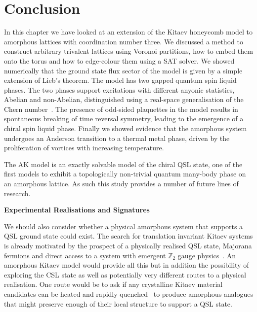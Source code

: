 \hypertarget{sec:AMK-Conclusion}{%
\section{Conclusion}\label{sec:AMK-Conclusion}}

In this chapter we have looked at an extension of the Kitaev honeycomb model to amorphous lattices with coordination number three. We discussed a method to construct arbitrary trivalent lattices using Voronoi partitions, how to embed them onto the torus and how to edge-colour them using a SAT solver. We showed numerically that the ground state flux sector of the model is given by a simple extension of Lieb's theorem. The model has two gapped quantum spin liquid phases. The two phases support excitations with different anyonic statistics, Abelian and non-Abelian, distinguished using a real-space generalisation of the Chern number~\autocite{peru_preprint}. The presence of odd-sided plaquettes in the model results in spontaneous breaking of time reversal symmetry, leading to the emergence of a chiral spin liquid phase. Finally we showed evidence that the amorphous system undergoes an Anderson transition to a thermal metal phase, driven by the proliferation of vortices with increasing temperature.

The AK model is an exactly solvable model of the chiral QSL state, one of the first models to exhibit a topologically non-trivial quantum many-body phase on an amorphous lattice. As such this study provides a number of future lines of research.

\textbf{Experimental Realisations and Signatures}

We should also consider whether a physical amorphous system that supports a QSL ground state could exist. The search for translation invariant Kitaev systems is already motivated by the prospect of a physically realised QSL state, Majorana fermions and direct access to a system with emergent \(\mathbb{Z}_2\) gauge physics~\autocite{TrebstPhysRep2022}. An amorphous Kitaev model would provide all this but in addition the possibility of exploring the CSL state as well as potentially very different routes to a physical realisation. One route would be to ask if any crystalline Kitaev material candidates can be heated and rapidly quenched~\autocite{Weaire1976,Petrakovski1981,Kaneyoshi2018} to produce amorphous analogues that might preserve enough of their local structure to support a QSL state.


